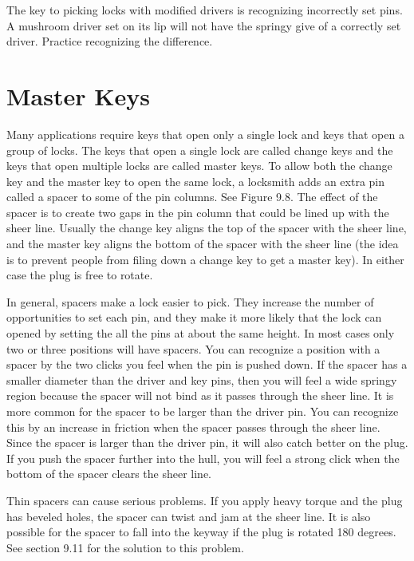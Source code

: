 The key to picking locks with modified drivers is recognizing incorrectly set pins. A 
mushroom driver set on its lip will not have the springy give of a correctly set driver. 
Practice recognizing the difference.

\section{Master Keys}
Many applications require keys that open only a single lock and keys that open a group 
of locks. The keys that open a single lock are called change keys and the keys that open 
multiple locks are called master keys. To allow both the change key and the master key to 
open the same lock, a locksmith adds an extra pin called a spacer to some of the pin columns. 
See Figure 9.8. The effect of the spacer is to create two gaps in the pin column that could 
be lined up with the sheer line. Usually the change key aligns the top of the spacer with the 
sheer line, and the master key aligns the bottom of the spacer with the sheer line (the idea 
is to prevent people from filing down a change key to get a master key). In either case the 
plug is free to rotate. 

In general, spacers make a lock easier to pick. They increase the number of opportunities 
to set each pin, and they make it more likely that the lock can opened by setting the all the 
pins at about the same height. In most cases only two or three positions will have spacers. 
You can recognize a position with a spacer by the two clicks you feel when the pin is pushed 
down. If the spacer has a smaller diameter than the driver and key pins, then you will feel a 
wide springy region because the spacer will not bind as it passes through the sheer line. It is
more common for the spacer to be larger than the driver pin. You can recognize this by an 
increase in friction when the spacer passes through the sheer line. Since the spacer is larger 
than the driver pin, it will also catch better on the plug. If you push the spacer further into 
the hull, you will feel a strong click when the bottom of the spacer clears the sheer line. 

Thin spacers can cause serious problems. If you apply heavy torque and the plug has 
beveled holes, the spacer can twist and jam at the sheer line. It is also possible for the spacer 
to fall into the keyway if the plug is rotated 180 degrees. See section 9.11 for the solution to 
this problem.

